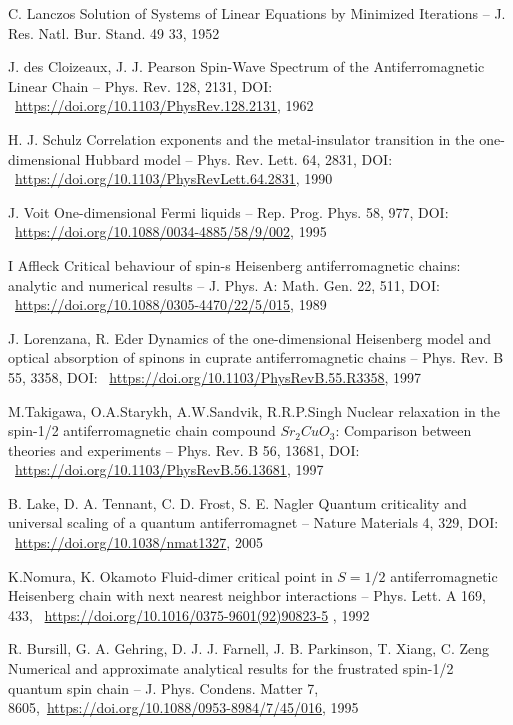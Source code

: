 \documentclass[11pt]{article}
\begin{document}
\begin{thebibliography}{3}
C. Lanczos Solution of Systems of Linear Equations by Minimized Iterations -- J. Res. Natl. Bur. Stand. 49 33, 1952

J. des Cloizeaux,  J. J. Pearson Spin-Wave Spectrum of the Antiferromagnetic Linear Chain -- Phys. Rev. 128, 2131, DOI: ~\url{https://doi.org/10.1103/PhysRev.128.2131}, 1962

 H. J. Schulz Correlation exponents and the metal-insulator transition in the one-dimensional Hubbard model -- Phys. Rev. Lett. 64, 2831, DOI: ~\url{https://doi.org/10.1103/PhysRevLett.64.2831}, 1990

J. Voit One-dimensional Fermi liquids -- Rep. Prog. Phys. 58, 977, DOI: ~\url{https://doi.org/10.1088/0034-4885/58/9/002}, 1995

I Affleck Critical behaviour of spin-s Heisenberg antiferromagnetic chains: analytic and numerical results -- J. Phys. A: Math. Gen. 22, 511, DOI: ~\url{https://doi.org/10.1088/0305-4470/22/5/015}, 1989

J. Lorenzana, R. Eder Dynamics of the one-dimensional Heisenberg model and optical absorption of spinons in cuprate antiferromagnetic chains -- Phys. Rev. B 55, 3358, DOI: ~\url{https://doi.org/10.1103/PhysRevB.55.R3358}, 1997

M.Takigawa, O.A.Starykh, A.W.Sandvik, R.R.P.Singh  Nuclear relaxation in the spin-1/2 antiferromagnetic chain compound $Sr_2CuO_3$: Comparison between theories and experiments -- Phys. Rev. B 56, 13681, DOI: ~\url{https://doi.org/10.1103/PhysRevB.56.13681}, 1997

B. Lake, D. A. Tennant, C. D. Frost, S. E. Nagler Quantum criticality and universal scaling of a quantum antiferromagnet -- Nature Materials 4, 329, DOI: ~\url{https://doi.org/10.1038/nmat1327}, 2005

K.Nomura, K. Okamoto Fluid-dimer critical point in $S=1/2$ antiferromagnetic Heisenberg chain with next nearest neighbor interactions -- Phys. Lett. A 169, 433, ~\url{https://doi.org/10.1016/0375-9601(92)90823-5} , 1992

R. Bursill, G. A. Gehring, D. J. J. Farnell, J. B. Parkinson, T. Xiang, C. Zeng Numerical and approximate analytical results for the frustrated spin-1/2 quantum spin chain -- J. Phys. Condens. Matter 7, 8605,~\url{https://doi.org/10.1088/0953-8984/7/45/016}, 1995


\end{thebibliography}
\end{document}
